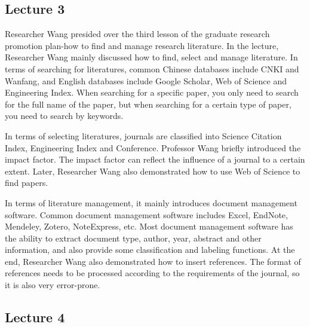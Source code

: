 \documentclass[UTF-8]{ctexart}
\begin{document}
\subsection{Lecture 3}
Researcher Wang presided over the third lesson of the graduate research promotion plan-how to find and manage research literature. In the lecture, Researcher Wang mainly discussed how to find, select and manage literature.
In terms of searching for literatures, common Chinese databases include CNKI and Wanfang, and English databases include Google Scholar, Web of Science and Engineering Index. When searching for a specific paper, you only need to search for the full name of the paper, but when searching for a certain type of paper, you need to search by keywords.

In terms of selecting literatures, journals are classified into Science Citation Index, Engineering Index and Conference. Professor Wang briefly introduced the impact factor. The impact factor can reflect the influence of a journal to a certain extent. Later, Researcher Wang also demonstrated how to use Web of Science to find papers.

In terms of literature management, it mainly introduces document management software. Common document management software includes Excel, EndNote, Mendeley, Zotero, NoteExpress, etc. Most document management software has the ability to extract document type, author, year, abstract and other information, and also provide some classification and labeling functions. At the end, Researcher Wang also demonstrated how to insert references. The format of references needs to be processed according to the requirements of the journal, so it is also very error-prone.

\subsection{Lecture 4} 
\end{document}
